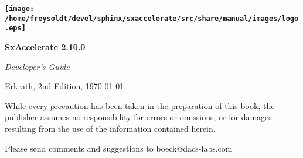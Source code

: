 \thispagestyle{empty}\vspace*{.5\textheight}


\begin{flushright}
\textbf{\Huge \texttt{[image: /home/freysoldt/devel/sphinx/sxaccelerate/src/share/manual/images/logo.eps]}}
\par\end{flushright}{\Huge \par}

\begin{flushright}
\textbf{\Huge SxAccelerate 2.10.0}
\par\end{flushright}{\Huge \par}

\begin{flushright}
{\Huge \hrulefill}
\par\end{flushright}{\Huge \par}

\begin{flushright}
\emph{\Huge Developer's Guide}
\par\end{flushright}{\Huge \par}

\newpage{}

\textbf{\Huge \thispagestyle{empty}}{\Huge \par}

{\small Erkrath, 2nd Edition, \today}{\small \par}

\vspace*{0.8\textheight}
While every precaution has been taken in the preparation of this book,
the publisher assumes no responsibility for errors or omissions, or
for damages resulting from the use of the information contained herein.
\vspace{1em}

Please send comments and suggestions to boeck@dacs-labs.com\newpage{}
